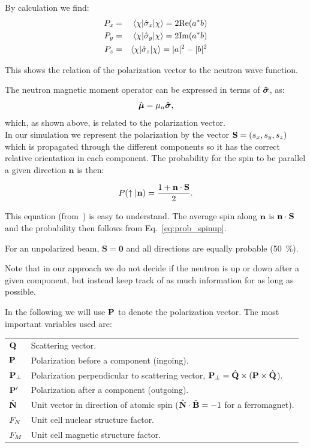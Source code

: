 By calculation we find:
\begin{eqnarray}
P_x & = & \langle \chi | \hat\sigma_x | \chi \rangle
= 2 \text{Re}(a^\ast b) \\
P_y & = & \langle \chi | \hat\sigma_y | \chi \rangle
= 2 \text{Im}(a^\ast b) \\
P_z & = & \langle \chi | \hat\sigma_z | \chi \rangle
= |a|^2-|b|^2
\end{eqnarray}

This shows the relation of the polarization vector to the neutron wave
function.

The neutron magnetic moment operator can be expressed in terms of $\boldsymbol{\hat\sigma}$,
as:
\begin{equation}
  \label{eq:magnetic}
  \hat{\boldsymbol{\mu}} = \mu_n \boldsymbol{\hat\sigma},
\end{equation}
which, as shown above, is related to the polarization vector.  \\

In our simulation we represent the polarization by the vector $\mathbf{S} = (s_x,
s_y, s_z)$ which is propagated through the different components so it has the
correct relative orientation in each component. The probability for the spin
to be parallel a given direction $\mathbf{n}$ is then:

 \begin{equation}
   \label{eq:probmcstas}
   P(\uparrow|\mathbf{n}) = \frac{1+\mathbf{n} \cdot \mathbf{S}}{2}.
 \end{equation}

This equation (from~\cite{pol_seeger}) is easy to understand. The
average spin along $\mathbf{n}$ is $\mathbf{n} \cdot \mathbf{S}$ and the probability then
follows from Eq.~\ref{eq:prob_spinup}.

For an unpolarized beam, $\mathbf{S} = \mathbf{0}$ and all directions
are equally probable (50~\%).

Note that in our approach we do not decide if the neutron is up or down after
a given component, but instead keep track of as much information for as long
as possible.

In the following we will use $\mathbf{P}$ to denote the polarization
vector. The most important variables used are:

\begin{tabular}{ll}

  $\mathbf{Q}$  & Scattering vector. \\
  $\mathbf{P}$  & Polarization before a component (ingoing). \\
  $\mathbf{P}_\perp$  & Polarization perpendicular to scattering vector,
  $\mathbf{P}_\perp = \hat{\mathbf{Q}} \times (\mathbf{P} \times \hat{\mathbf{Q}}$). \\
  $\mathbf{P}'$ & Polarization after a component (outgoing). \\
  $\hat{\mathbf{N}}$ & Unit vector in direction of atomic spin ($\hat{\mathbf{N}} \cdot \tilde{\mathbf{B}} = -1$ for a ferromagnet). \\
  $F_N$ & Unit cell nuclear structure factor. \\
  $F_M$ & Unit cell magnetic structure factor. \\
\end{tabular}
\\

